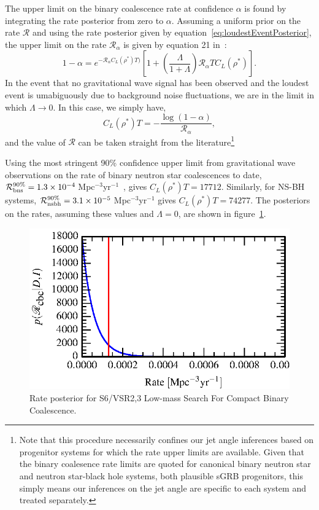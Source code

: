 \documentclass[nofootinbib]{revtex4}
\newcommand{\gw}{gravitational wave }
\newcommand{\cbcrate}{{{\mathcal R}}}
\newcommand{\rhostar}{{\rho^*}}
\begin{document}
The upper limit on the binary coalescence rate at confidence $\alpha$ is found
by integrating the rate posterior from zero to $\alpha$.  Assuming a uniform
prior on the rate $\cbcrate$ and using the rate posterior given by
equation~\ref{eq:loudestEventPosterior}, the upper limit on the rate
$\cbcrate_{\alpha}$ is given by equation 21 in~\cite{BradyFairhurst08}:
%
\begin{equation}
1-\alpha =  e^{-\cbcrate_{\alpha} C_L(\rhostar)T)}
\left[ 
1+ \left(\frac{\Lambda}{1+\Lambda}\right) \cbcrate_{\alpha} T C_L(\rhostar)
\right ].
\label{eq:rateIntegral}
\end{equation}
%
In the event that no \gw signal has been observed and the loudest event is
umabiguously due to background noise fluctuations, we are in the limit in which
$\Lambda \rightarrow 0$.  In this case, we simply have,
\begin{equation}
C_L(\rhostar)T = -\frac{\log(1-\alpha)}{\cbcrate_{\alpha}},
\end{equation}
%
and the value of $\cbcrate$ can be taken straight from the literature\footnote{Note
that this procedure necessarily confines our jet angle inferences based on
progenitor systems for which the rate upper limits are available.  Given that
the binary coalesence rate limits are quoted for canonical binary neutron star
and neutron star-black hole systems, both plausible sGRB progenitors, this
simply means our inferences on the jet angle are specific to each system and
treated separately.}

Using the most stringent 90\% confidence upper limit from \gw observations on
the rate of binary neutron star coalescences to date, $\cbcrate^{90\%}_{{\rm
bns}} = 1.3\times 10^{-4}$\,Mpc$^{-3}$yr$^{-1}$~\cite{S6lowmass}, gives
$C_L(\rhostar)T=17712$.  Similarly, for NS-BH systems,  $\cbcrate^{90\%}_{{\rm
nsbh}} = 3.1\times 10^{-5}$\,Mpc$^{-3}$yr$^{-1}$ gives $C_L(\rhostar)T=74277$.
The posteriors on the rates, assuming these values and $\Lambda=0$, are shown in
figure~\ref{fig:reconstructedRatePosterior}.  

\begin{figure}
\includegraphics{rate_posterior_s6UL_TEST_deltaEffPrior-1.0.eps}
\caption{Rate posterior for S6/VSR2,3 Low-mass Search For Compact Binary
Coalescence.\label{fig:reconstructedRatePosterior}}
\end{figure}
\end{document}
